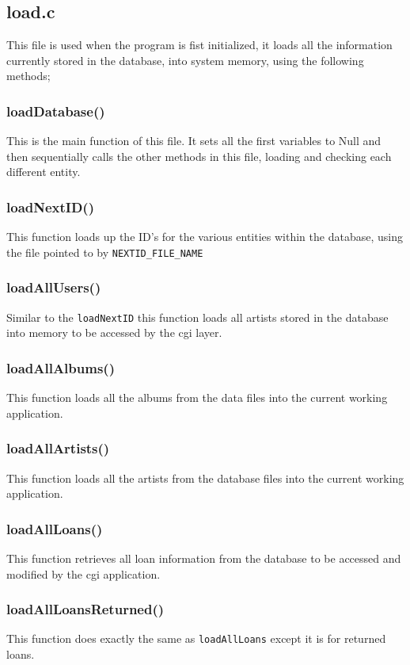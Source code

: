 \documentclass{article}
\begin{document}
\subsection{load.c}
This file is used when the program is fist initialized, it loads all the information currently stored in the database, into system memory, using the following methods;

\subsubsection*{loadDatabase()}
This is the main function of this file. It sets all the first variables to Null
and then sequentially calls the other methods in this file, loading and checking each different entity.

\subsubsection*{loadNextID()}
This function loads up the ID's for the various entities within the database, using the file pointed to by \verb|NEXTID_FILE_NAME|

\subsubsection*{loadAllUsers()}
Similar to the \verb|loadNextID| this function loads all artists stored in the database into memory to be accessed by the cgi layer.

\subsubsection*{loadAllAlbums()}
This function loads all the albums from the data files into the current working application.

\subsubsection*{loadAllArtists()}
This function loads all the artists from the database files into the current working application.

\subsubsection*{loadAllLoans()}
\label{loan}
This function retrieves all loan information from the database to be accessed and modified by the cgi application.

\subsubsection*{loadAllLoansReturned()}
This function does exactly the same as \verb|loadAllLoans| except it is for returned loans.
\end{document}
